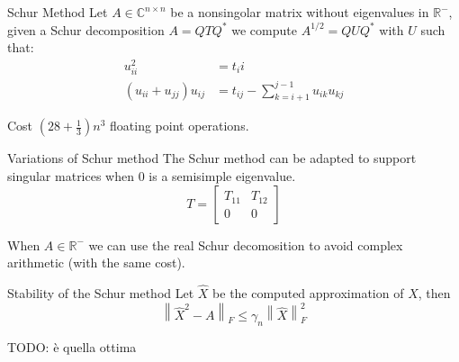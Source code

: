 \documentclass{beamer}
\theoremstyle{plain}
\theoremstyle{definition}
\theoremstyle{remark}
\newcommand{\pa}[1]{\left(#1\right)}
\newcommand{\bra}[1]{\left[#1\right]}
\newcommand{\norm}[1]{\left\|#1\right\|}
\begin{document}
\begin{frame}{Schur Method}
  Let $A \in \mathbb{C}^{n\times n}$ be a nonsingolar matrix without
  eigenvalues in $\mathbb{R}^-$, given a Schur decomposition
  $A = QTQ^*$ we compute $A^{1/2} = Q U Q^*$ with $U$ such that:
  \begin{align*}
    u_{ii}^2 &= t_ii \\
    \pa{u_{ii} + u_{jj}} u_{ij} &= t_{ij} - \sum _{k=i+1} ^{j-1}
                                  u_{ik}u_{kj}
  \end{align*}
  
  \begin{block}{Cost}
    $\pa{ 28+\frac{1}{3}} n^3$ floating point operations.
  \end{block}
\end{frame}

\begin{frame}{Variations of Schur method}
  The Schur method can be adapted to support singular matrices when
  $0$ is a semisimple eigenvalue.
  \[ T = \bra{
      \begin{matrix}
        T_{11} & T_{12} \\
        0 & 0 
      \end{matrix}
    } \]
  \vfill

  When $A \in \mathbb{R}^-$ we can use the real Schur decomosition to
  avoid complex arithmetic (with the same cost).
\end{frame}

\begin{frame}{Stability of the Schur method}
  Let $\hat {X}$ be the computed approximation of $X$, then
  \[ \norm{{\hat{X}}^2 - A} _F \le \gamma _n \norm{\hat{X}}_F ^2 \]
  
  TODO: è quella ottima
\end{frame}
\end{document}
